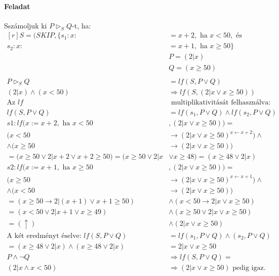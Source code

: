 \documentclass[12pt]{article}
\newcommand{\haromszog}[2]{$#1 \vartriangleright_S #2$}
\begin{document}
\paragraph{Feladat}
\par Sszámoljuk ki \haromszog{P}{Q}-t, ha:\\
$
\begin{aligned}[r]
S = (SKIP, \{s_1: x :&= x+2, \text{ ha } x<50, \text{ és}\\
s_2: x :&= x+1, \text{ ha } x\ge 50 \}\\
&P = (2|x)\\
&Q = (x\ge50)\\
 \\
P \vartriangleright_S Q &= lf(S, P \lor Q)\\
(2|x)\land (x<50) &\Rightarrow lf(S, (2|x \lor x\ge50)) \\
\text{Az } lf &\text{ multiplikativitását felhasználva:}\\
lf(S,P \lor Q) &= lf(s_1, P\lor Q) \land lf(s_2, P\lor Q)\\
s1: lf(x:=x+2, \text { ha } x<50 &, (2|x \lor x\ge50) ) = \\
(x<50 &\rightarrow (2|x \lor x\ge50)^{x \leftarrow x+2}) \land \\
\land (x\ge50 &\rightarrow (2|x \lor x\ge50))\\
=(x\ge50 \lor 2|x+2 \lor x+2\ge50) = (x\ge50 \lor 2|x &\lor x\ge48)= (x\ge48 \lor 2|x)\\
s2: lf(x:=x+1, \text { ha } x\ge50 &, (2|x \lor x\ge50) ) = \\
(x\ge50 &\rightarrow (2|x \lor x\ge50)^{x \leftarrow x+1}) \land \\
\land (x<50 &\rightarrow (2|x \lor x\ge50))\\
=(x\ge50 \rightarrow 2|(x+1) \lor x+1\ge50) &\land (x<50 \rightarrow 2|x \lor x\ge50)\\
=(x<50 \lor 2|x+1 \lor x\ge49) &\land (x\ge50 \lor 2|x \lor x\ge50)\\
=(\uparrow) &\land (2|x \lor x\ge50)\\
\text{A két eredményt éselve: } lf(S,P\lor Q) &= lf(s_1,P\lor Q) \land (s_2, P \lor Q)\\
=(x\ge48 \lor 2|x) \land (x\ge48 \lor 2|x) &= 2|x \lor x\ge50\\
P\land \neg Q &\Rightarrow lf(S,P\lor Q) =\\
(2|x \land x<50) &\Rightarrow (2|x \lor x\ge50) \text{ pedig igaz.}
\end{aligned}
$
\end{document}
